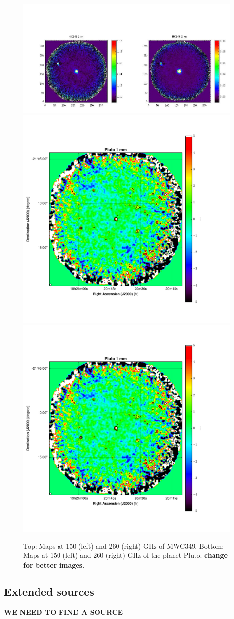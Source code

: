 \documentclass[]{aa} %
\begin{document}
\begin{figure}[h]
   \centering
   \includegraphics[width=.95\linewidth]{MWC349_v0.jpeg}
        \includegraphics[width=.45\linewidth]{Pluto_1mm_map_snrcont.pdf}
    \includegraphics[width=.45\linewidth]{Pluto_1mm_map_snrcont.pdf}
      \caption{Top: Maps at 150 (left) and 260 (right) GHz of MWC349. Bottom: Maps at 150 (left) and 260 (right) GHz of the planet Pluto. {\bf change for better images}. 
         \label{fig_compact_sources}}
\end{figure}


\subsection{Extended sources}
{\bf WE NEED TO FIND A SOURCE}
\end{document}
